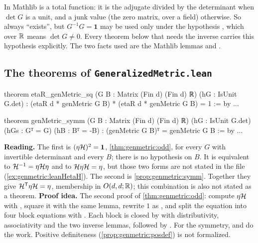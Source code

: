 \begin{pitfallbox}
In Mathlib  is a total function: it is the adjugate divided by the determinant
when $\det G$ is a unit, and a junk value (the zero matrix, over a field) otherwise. So
 always ``exists'', but $G^{-1}G=\mathbf 1$ may be used only under the
hypothesis , which over $\mathbb{R}$ means $\det G\ne0$. Every theorem below
that needs the inverse carries this hypothesis explicitly. The two facts used are the
Mathlib lemmas  and .
\end{pitfallbox}

\subsection{The theorems of \texttt{GeneralizedMetric.lean}}

\begin{leanbox}
\begin{leancode}
theorem etaR_genMetric_sq (G B : Matrix (Fin d) (Fin d) ℝ)
    (hG : IsUnit G.det) :
    (etaR d * genMetric G B) * (etaR d * genMetric G B) = 1 := by ...

theorem genMetric_symm (G B : Matrix (Fin d) (Fin d) ℝ) (hG : IsUnit G.det)
    (hGs : Gᵀ = G) (hB : Bᵀ = -B) :
    (genMetric G B)ᵀ = genMetric G B := by ...
\end{leancode}
\textbf{Reading.} The first is $(\eta\mathcal{H})^2=\mathbf 1$, \cref{thm:genmetric:odd}, for every
$G$ with invertible determinant and every $B$; there is no hypothesis on $B$. It is
equivalent to $\mathcal{H}^{-1}=\eta\mathcal{H}\eta$ and to $\mathcal{H}\eta\mathcal{H}=\eta$, but those two forms are not
stated in the file (\cref{ex:genmetric:leanHetaH}). The second is
\cref{prop:genmetric:symm}. Together they give $\mathcal{H}^{\mathsf T}\eta\mathcal{H}=\eta$, membership
in $O(d,d;\mathbb{R})$; this combination is also not stated as a theorem.
\textbf{Proof idea.} The second proof of \cref{thm:genmetric:odd}: compute $\eta\mathcal{H}$ with
, square it with the same lemma, rewrite $1$ as
, and split the equation into four block equations with
. Each block is closed by  with
distributivity, associativity and the two inverse lemmas, followed by . For the
symmetry,  and  do
the work. Positive definiteness (\cref{prop:genmetric:posdef}) is not formalized.
\end{leanbox}

